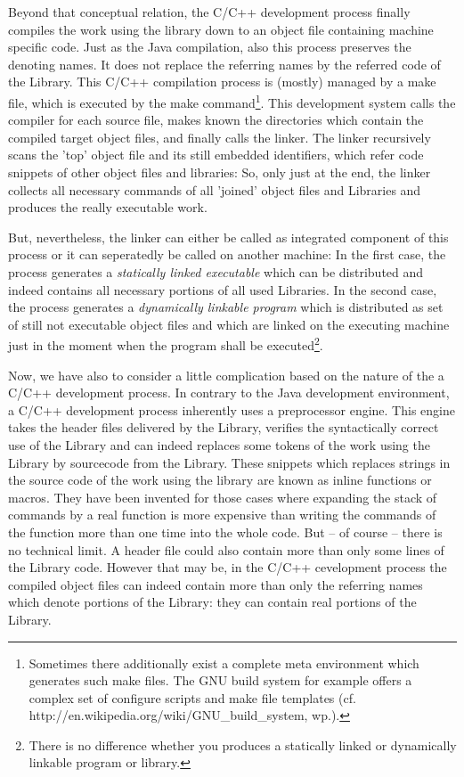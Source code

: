 Beyond that conceptual relation, the C/C++ development process finally compiles
the work using the library down to an object file containing machine specific
code. Just as the Java compilation, also this process preserves the denoting
names. It does not replace the referring names by the referred code of the
Library. This C/C++ compilation process is (mostly) managed by a make file,
which is executed by the make command\footnote{Sometimes there additionally
exist a complete meta environment which generates such make files. The GNU build
system for example offers a complex set of configure scripts and make file
templates (cf. http://en.wikipedia.org/wiki/GNU\_build\_system, wp.).}. This
development system calls the compiler for each source file, makes known the
directories which contain the compiled target object files, and finally calls
the linker. The linker recursively scans the 'top' object file and its still
embedded identifiers, which refer code snippets of other object files and
libraries: So, only just at the end, the linker collects all necessary commands
of all 'joined' object files and Libraries and produces the really executable
work.

But, nevertheless, the linker can either be called as integrated component of
this process or it can seperatedly be called on another machine: In the first
case, the process generates a \emph{statically linked executable} which can be
distributed and indeed contains all necessary portions of all used Libraries. In
the second case, the process generates a \emph{dynamically linkable program}
which is distributed as set of still not executable object files and which are
linked on the executing machine just in the moment when the program shall be
executed\footnote{There is no difference whether you produces a statically
linked or dynamically linkable program or library.}.

Now, we have also to consider a little complication based on the nature of the a
C/C++ development process. In contrary to the Java development environment, a
C/C++ development process inherently uses a preprocessor engine.
This engine takes the header files delivered by the Library, verifies the
syntactically correct use of the Library and can indeed replaces some tokens of
the work using the Library by sourcecode from the Library. These snippets which
replaces strings in the source code of the work using the library are known as
inline functions or macros. They have been invented for those cases where
expanding the stack of commands by a real function is more expensive than
writing the commands of the function more than one time into the whole code. But
-- of course -- there is no technical limit. A header file could also contain
more than only some lines of the Library code. However that may be, in the C/C++
cevelopment process the compiled object files can indeed contain more than only
the referring names which denote portions of the Library: they can contain real
portions of the Library.
 
